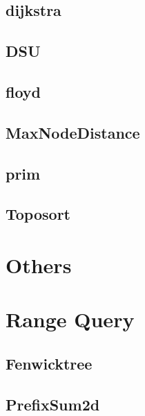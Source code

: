 \subsection{dijkstra}
\raggedbottom
\hrulefill
\subsection{DSU}
\raggedbottom
\hrulefill
\subsection{floyd}
\raggedbottom
\hrulefill
\subsection{MaxNodeDistance}
\raggedbottom
\hrulefill
\subsection{prim}
\raggedbottom
\hrulefill
\subsection{Toposort}
\raggedbottom
\hrulefill

\section{Others}

\section{Range Query}
\subsection{Fenwicktree}
\raggedbottom
\hrulefill
\subsection{PrefixSum2d}
\raggedbottom
\hrulefill
